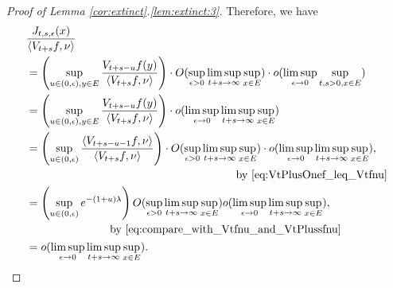 \documentclass[12pt,a4paper]{amsart}
\numberwithin{equation}{section}
\theoremstyle{plain}
\theoremstyle{definition}
\begin{document}
\begin{proof}[Proof of Lemma \ref{cor:extinct}.\eqref{lem:extinct:3}]
Therefore, we have
\begin{align}
&\frac{J_{t,s,\epsilon}(x)}{\left \langle V_{t+s}f,\nu\right\rangle}
  \\ & =\left(\sup_{u\in (0,\epsilon), y \in E}\frac{V_{t+s-u}f(y)}{\left\langle V_{t+s}f,\nu \right\rangle}\right)\cdot O(\sup_{\epsilon>0}\limsup_{t+s\to \infty} \sup_{x\in E})\cdot o(\limsup_{\epsilon \to 0}\sup_{t,s>0,x\in E})
  \\ & = \left(\sup_{u\in (0,\epsilon), y \in E}\frac{V_{t+s-u}f(y)}{\left\langle V_{t+s}f,\nu \right\rangle}\right)\cdot o(\limsup_{\epsilon \to 0}\limsup_{t+s\to \infty}\sup_{x\in E})
  \\ & \begin{multlined} = \left(\sup_{u\in (0,\epsilon)}\frac{\left\langle V_{t+s - u - 1} f, \nu \right\rangle}{\left\langle V_{t+s}f,\nu \right\rangle} \right) \cdot O(\sup_{\epsilon >  0}\limsup_{t+s \to \infty}\sup_{x\in E}) \cdot o(\limsup_{\epsilon \to 0}\limsup_{t+s\to \infty}\sup_{x\in E}),
\\\quad\text{by~\eqref{eq:VtPlusOnef_leq_Vtfnu}} \end{multlined}
  \\ & \begin{multlined}
= \left(\sup_{u\in (0,\epsilon)}e^{-(1+u) \lambda} \right) O(\sup_{\epsilon > 0} \limsup_{t+s\to \infty}\sup_{x\in E}) o(\limsup_{\epsilon \to 0}\limsup_{t+s\to \infty}\sup_{x\in E}),
\\ \quad\text{by~\eqref{eq:compare_with_Vtfnu_and_VtPlussfnu}}
\end{multlined}
\\ & = o(\limsup_{\epsilon \to 0}\limsup_{t+s\to \infty}\sup_{x\in E}). \label{eq:8}
\end{align}


\end{proof}
\end{document}
